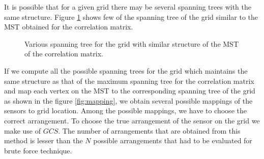 It is possible that for a given grid there may be several spanning trees with the same structure. 
Figure \ref{fig:variousMappings} shows few of the spanning tree of the grid similar to the MST obtained for the correlation matrix.
\begin{figure}[!ht]

\caption{Various spanning tree for the grid with similar structure of the MST of the correlation matrix.}
\label{fig:variousMappings}
\end{figure}


If we compute all the possible spanning trees for the grid which maintains the same structure as that of the maximum spanning tree for the correlation matrix and map each vertex on the MST to the corresponding spanning tree of the grid as shown in the figure \ref{fig:mapping}, we obtain several possible mappings of the sensors to grid location. Among the possible mappings, we have to choose the correct arrangement. To choose the true arrangement of the sensor on the grid we make use of  $GCS$. 
The number of arrangements that are obtained from this method is lesser than the ${N}$  possible arrangements that had to be evaluated for brute force technique.


